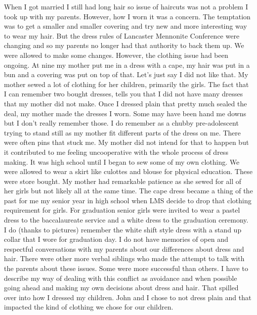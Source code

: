 When I got married I still had long hair so issue of haircuts was not a problem I took up with my parents.
However, how I worn it was a concern.
The temptation was to get a smaller and smaller covering and try new and more interesting way to wear my hair.
But the dress rules of Lancaster Mennonite Conference were changing and so my parents no longer had that authority to back them up.
We were allowed to make some changes.
However, the clothing issue had been ongoing.
At nine my mother put me in a dress with a cape, my hair was put in a bun and a covering was put on top of that.
Let's just say I did not like that.
My mother sewed a lot of clothing for her children, primarily the girls.
The fact that I can remember two bought dresses, tells you that I did not have many dresses that my mother did not make.
Once I dressed plain that pretty much sealed the deal, my mother made the dresses I worn.
Some may have been hand me downs but I don't really remember those.
I do remember as a chubby pre-adolescent trying to stand still as my mother fit different parts of the dress on me.
There were often pins that stuck me.
My mother did not intend for that to happen but it contributed to me feeling uncooperative with the whole process of dress making.
It was high school until I began to sew some of my own clothing.
We were allowed to wear a skirt like culottes and blouse for physical education.
These were store bought.
My mother had remarkable patience as she sewed for all of her girls but not likely all at the same time.
The cape dress became a thing of the past for me my senior year in high school when LMS decide to drop that clothing requirement for girls.
For graduation senior girls were invited to wear a pastel dress to the baccalaureate service and a white dress to the graduation ceremony.
I do (thanks to pictures) remember the white shift style dress with a stand up collar that I wore for graduation day.
I do not have memories of open and respectful conversations with my parents about our differences about dress and hair.
There were other more verbal siblings who made the attempt to talk with the parents about these issues.
Some were more successful than others.
I have to describe my way of dealing with this conflict as avoidance and when possible going ahead and making my own decisions about dress and hair.
That spilled over into how I dressed my children.
John and I chose to not dress plain and that impacted the kind of clothing we chose for our children.





